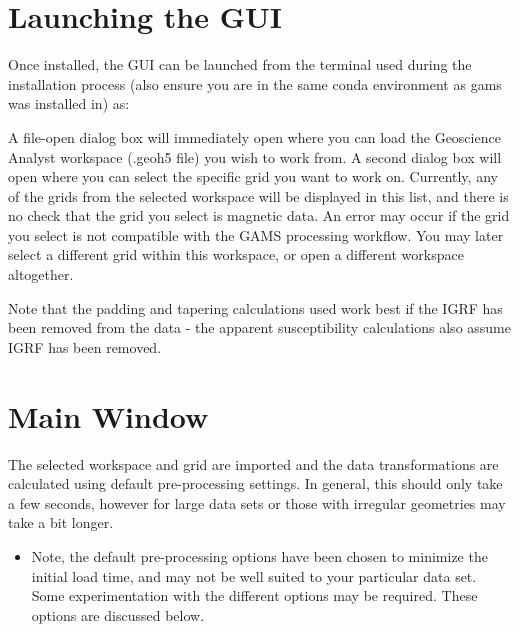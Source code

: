 \documentclass[letterpaper,10pt,english,openany,oneside]{sphinxmanual}
\begin{document}
\section{Launching the GUI}
\label{\detokenize{content/getting_started/GUI_overview:launching-the-gui}}\label{\detokenize{content/getting_started/GUI_overview::doc}}
Once installed, the GUI can be launched from the terminal used during the installation process (also ensure you are in the same conda environment as gams was installed in) as:

\begin{sphinxVerbatim}[commandchars=\\\{\}]
\end{sphinxVerbatim}

A file-open dialog box will immediately open where you can load the Geoscience Analyst workspace (.geoh5 file) you wish to work from. A second dialog box will open where you can select the specific grid you want to work on. Currently, any of the grids from the selected workspace will be displayed in this list, and there is no check that the grid you select is magnetic data. An error may occur if the grid you select is not compatible with the GAMS processing workflow. You may later select a different grid within this workspace, or open a different workspace altogether.

Note that the padding and tapering calculations used work best if the IGRF has been removed from the data - the apparent susceptibility calculations also assume IGRF has been removed.


\section{Main Window}
\label{\detokenize{content/getting_started/GUI_overview:main-window}}
The selected workspace and grid are imported and the data transformations are calculated using default pre-processing settings. In general, this should only take a few seconds, however for large data sets or those with irregular geometries may take a bit longer.
\begin{itemize}
\item {} 
Note, the default pre-processing options have been chosen to minimize the initial load time, and may not be well suited to your particular data set. Some experimentation with the different options may be required. These options are discussed below.

\end{itemize}
\end{document}
